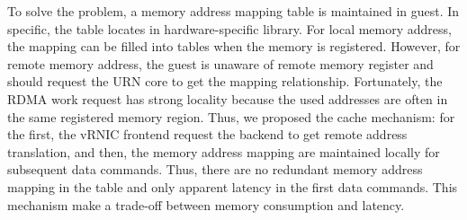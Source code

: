 To solve the problem, a memory address mapping table is maintained in guest. In specific, the table locates in hardware-specific library. For local memory address, the mapping can be filled into tables when the memory is registered. However, for remote memory address, the guest is unaware of remote memory register and should request the URN core to get the mapping relationship. Fortunately, the RDMA work request has strong locality because the used addresses are often in the same registered memory region. Thus, we proposed the cache mechanism: for the first, the vRNIC frontend request the backend to get remote address translation, and then, the memory address mapping are maintained locally for subsequent data commands. Thus, there are no redundant memory address mapping in the table and only apparent latency in the first data commands. This mechanism make a trade-off between memory consumption and latency.


